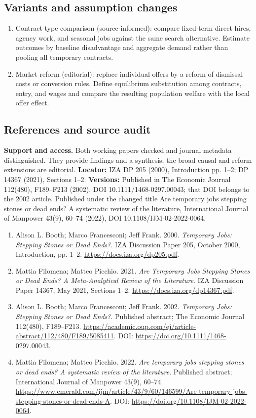 \documentclass[11pt,a4paper]{article}
\begin{document}
\subsection*{Variants and assumption changes}
\begin{enumerate}
\item Contract-type comparison (source-informed): compare fixed-term direct hires, agency work, and seasonal jobs against the same search alternative. Estimate outcomes by baseline disadvantage and aggregate demand rather than pooling all temporary contracts.
\item Market reform (editorial): replace individual offers by a reform of dismissal costs or conversion rules. Define equilibrium substitution among contracts, entry, and wages and compare the resulting population welfare with the local offer effect.
\end{enumerate}
\subsection*{References and source audit}
\textbf{Support and access.} Both working papers checked and journal metadata distinguished. They provide findings and a synthesis; the broad causal and reform extensions are editorial. \textbf{Locator:} IZA DP 205 (2000), Introduction pp. 1--2; DP 14367 (2021), Sections 1--2. \textbf{Versions:} Published in The Economic Journal 112(480), F189--F213 (2002), DOI 10.1111/1468-0297.00043; that DOI belongs to the 2002 article. Published under the changed title Are temporary jobs stepping stones or dead ends? A systematic review of the literature, International Journal of Manpower 43(9), 60--74 (2022), DOI 10.1108/IJM-02-2022-0064.  
\begin{enumerate}\raggedright
\item\hypertarget{definitions:source:30007641:1}{} Alison L. Booth; Marco Francesconi; Jeff Frank. 2000. \emph{Temporary Jobs: Stepping Stones or Dead Ends?}. IZA Discussion Paper 205, October 2000, Introduction, pp. 1--2.
\url{https://docs.iza.org/dp205.pdf}.
\item\hypertarget{definitions:source:30007641:2}{} Mattia Filomena; Matteo Picchio. 2021. \emph{Are Temporary Jobs Stepping Stones or Dead Ends? A Meta-Analytical Review of the Literature}. IZA Discussion Paper 14367, May 2021, Sections 1--2.
\url{https://docs.iza.org/dp14367.pdf}.
\item\hypertarget{definitions:source:30007641:3}{} Alison L. Booth; Marco Francesconi; Jeff Frank. 2002. \emph{Temporary Jobs: Stepping Stones or Dead Ends?}. Published abstract; The Economic Journal 112(480), F189--F213.
\url{https://academic.oup.com/ej/article-abstract/112/480/F189/5085411}.
DOI: \url{https://doi.org/10.1111/1468-0297.00043}.
\item\hypertarget{definitions:source:30007641:4}{} Mattia Filomena; Matteo Picchio. 2022. \emph{Are temporary jobs stepping stones or dead ends? A systematic review of the literature}. Published abstract; International Journal of Manpower 43(9), 60--74.
\url{https://www.emerald.com/ijm/article/43/9/60/146599/Are-temporary-jobs-stepping-stones-or-dead-ends-A}.
DOI: \url{https://doi.org/10.1108/IJM-02-2022-0064}.
\end{enumerate}
\end{document}
